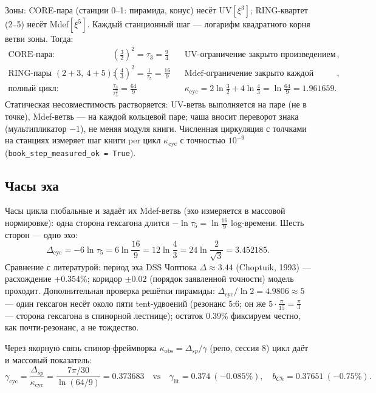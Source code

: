 \documentclass[11pt,a4paper]{article}
\newcommand{\kap}{\kappa_{\mathrm{cyc}}}
\newcommand{\Dcy}{\Delta_{\mathrm{cyc}}}
\newcommand{\tauu}{\tau_{3}}
\newcommand{\tauf}{\tau_{5}}
\begin{document}
Зоны: CORE-пара (станции 0--1: пирамида, конус) несёт UV$[\xi^3]$; RING-квартет
(2--5) несёт Mdef$[\xi^5]$. Каждый станционный шаг --- логарифм квадратного
корня ветви зоны. Тогда:
\begin{align}
\text{CORE-пара:}\quad & \left(\tfrac32\right)^2 = \tauu = \frac94
   && \text{UV-ограничение закрыто произведением ПАРЫ},\\
\text{RING-пары } (2{+}3,\ 4{+}5)\text{:}\quad &
   \left(\tfrac43\right)^2 = \frac{1}{\tauf} = \frac{16}{9}
   && \text{Mdef-ограничение закрыто каждой парой},\\
\text{полный цикл:}\quad & \frac{\tauu}{\tauf^{2}} = \frac{64}{9}
   && \kap = 2\ln\tfrac32 + 4\ln\tfrac43 = \ln\tfrac{64}{9} = 1.961659.
\end{align}
Статическая несовместимость растворяется: UV-ветвь выполняется на паре
(не в точке), Mdef-ветвь --- на каждой кольцевой паре; чаша вносит переворот
знака (мультипликатор $-1$), не меняя модуля книги. Численная циркуляция с
толчками на станциях измеряет шаг книги per цикл $\kap$ с точностью
$10^{-9}$ (\texttt{book\_step\_measured\_ok = True}).

\subsection{Часы эха}

Часы цикла глобальные и задаёт их Mdef-ветвь (эхо измеряется в массовой
нормировке): одна сторона гексагона длится $-\ln\tauf = \ln\frac{16}{9}$
log-времени. Шесть сторон --- одно эхо:
\begin{equation}
\Dcy = -6\ln\tauf = 6\ln\frac{16}{9} = 12\ln\frac43 = 24\ln\frac{2}{\sqrt3}
      = 3.452185.
\end{equation}
Сравнение с литературой: период эха DSS Чоптюка $\Delta \approx 3.44$
(Choptuik, 1993) --- расхождение $+0.354\%$; коридор $\pm0.02$ (порядок
заявленной точности) модель проходит. Дополнительная проверка
решётки пирамиды: $\Dcy/\ln 2 = 4.9806 \approx 5$ --- один гексагон несёт
около пяти tent-удвоений (резонанс 5:6; он же $5\cdot\frac{\pi}{15} =
\frac{\pi}{3}$ --- сторона гексагона в спинорной лестнице); остаток $0.39\%$
фиксируем честно, как почти-резонанс, а не тождество.

Через якорную связь спинор-фреймворка $\kappa_{\mathrm{obs}} = \Delta_{sp}/\gamma$
(репо, сессия 8) цикл даёт и массовый показатель:
\begin{equation}
\gamma_{\mathrm{cyc}} = \frac{\Delta_{sp}}{\kap}
= \frac{7\pi/30}{\ln(64/9)} = 0.373683
\quad \text{vs}\quad \gamma_{\mathrm{lit}} = 0.374\ (-0.085\%),\quad
b_{Ch} = 0.37651\ (-0.75\%).
\end{equation}
\end{document}
